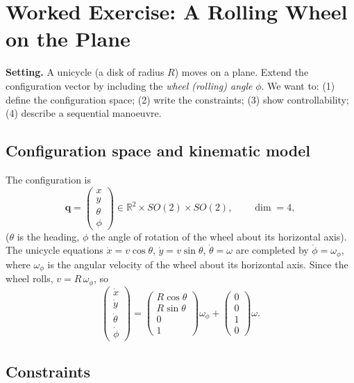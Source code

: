 \documentclass[11pt,a4paper]{article}
\theoremstyle{definition}
\theoremstyle{plain}
\newcommand{\R}{\mathbb{R}}
\newcommand{\qv}{\bm{q}}
\begin{document}
\section{Worked Exercise: A Rolling Wheel on the Plane}

\textbf{Setting.} A unicycle (a disk of radius $R$) moves on a plane. Extend the configuration vector by including the \emph{wheel (rolling) angle} $\phi$. We want to: (1) define the configuration space; (2) write the constraints; (3) show controllability; (4) describe a sequential manoeuvre.

\subsection{Configuration space and kinematic model}

The configuration is
\[
 \qv=\begin{pmatrix}x\\y\\\theta\\\phi\end{pmatrix}\in\R^2\times SO(2)\times SO(2),\qquad \dim=4 ,
\]
($\theta$ is the heading, $\phi$ the angle of rotation of the wheel about its horizontal axis). The unicycle equations $\dot x=v\cos\theta$, $\dot y=v\sin\theta$, $\dot\theta=\omega$ are completed by $\dot\phi=\omega_\phi$, where $\omega_\phi$ is the angular velocity of the wheel about its horizontal axis. Since the wheel rolls, $v=R\,\omega_\phi$, so
\[
 \begin{pmatrix}\dot x\\\dot y\\\dot\theta\\\dot\phi\end{pmatrix}
 =\begin{pmatrix}R\cos\theta\\R\sin\theta\\0\\1\end{pmatrix}\omega_\phi
 +\begin{pmatrix}0\\0\\1\\0\end{pmatrix}\omega .
\]

\subsection{Constraints}
\end{document}
